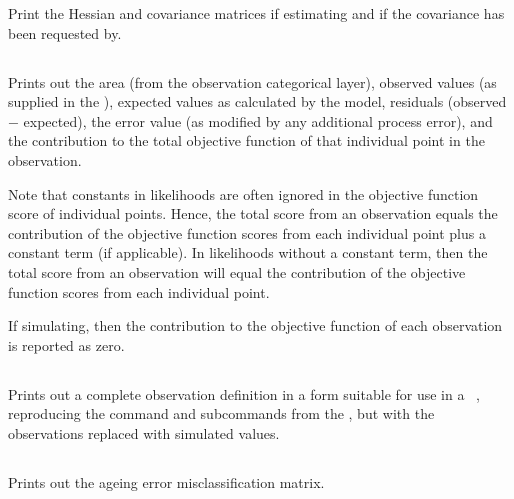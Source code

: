 Print the Hessian and covariance matrices if estimating and if the covariance has been requested by.

\subsection{}

Prints out the area (from the observation categorical layer), observed values (as supplied in the \config), expected values as calculated by the model, residuals (observed $-$ expected), the error value (as modified by any additional process error), and the contribution to the total objective function of that individual point in the observation. 

Note that constants in likelihoods are often ignored in the objective function score of individual points. Hence, the total score from an observation equals the contribution of the objective function scores from each individual point plus a constant term (if applicable). In likelihoods without a constant term, then the total score from an observation will equal the contribution of the objective function scores from each individual point.

If simulating, then the contribution to the objective function of each observation is reported as zero. 

\subsection{}

Prints out a complete observation definition in a form suitable for use in a \SPM\ \config, reproducing the command and subcommands from the \config, but with the observations replaced with simulated values.

\subsection{}\label{sec:ageingerrorreport}

Prints out the ageing error misclassification matrix.

\subsection{}


